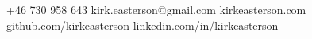 \documentclass[10pt,letterpaper]{article}
\begin{document}
 










														

\begin{center}\spacedhrule{-.9em}{-.9em}\end{center}
\small +46 730 958 643 \hfill{}\hfill kirk.easterson@gmail.com \hfill{}\hfill kirkeasterson.com \hfill{}\hfill github.com/kirkeasterson \hfill{}\hfill linkedin.com/in/kirkeasterson
\begin{center}\spacedhrule{-.4em}{-1.3em}\end{center}












\end{document}
